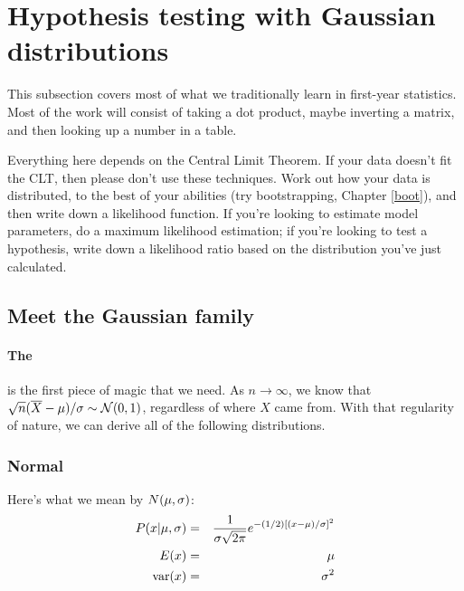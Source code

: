 \def\var{\hbox{var}} \def\cov{\hbox{cov}}
\chapter[Gaussian tricks]{Hypothesis testing with Gaussian distributions} \label{gauss}

This subsection covers most of what we traditionally learn in first-year statistics. 
 Most of the work will consist of taking a dot product, maybe inverting a matrix,
and then looking up a number in a table. 

Everything here depends on the Central Limit Theorem. If your data doesn't fit the CLT, then please don't use
these techniques. Work out how your data is distributed, to the best of your abilities
(try bootstrapping, Chapter \ref{boot}), and then write down a likelihood function. If you're looking to
estimate model parameters, do a maximum likelihood estimation; if you're looking to test a hypothesis,
write down a likelihood ratio based on the distribution you've just calculated.

\section{Meet the Gaussian family}

\subsubsection{The } is the first piece of magic
that we need. As $n\to \infty$, we know that $\sqrt{n} (\overline X -
\mu)/\sigma \sim {\cal N}(0,1)$, regardless of where $X$ came
from. With that regularity of nature, we can derive all of the following distributions.
\label{CLT}

\subsection{Normal} 

Here's what we mean by ${\cal}N(\mu,\sigma)$:
\begin{eqnarray}					\label{normal}
P(x|\mu,\sigma)&=&{1\over \sigma\sqrt{2\pi}} e^{-(1/2)[(x-\mu)/\sigma]^2}\\ 
E(x)&=&\mu							\nonumber\\
\var(x)&=&\sigma^2						\nonumber
\end{eqnarray}


